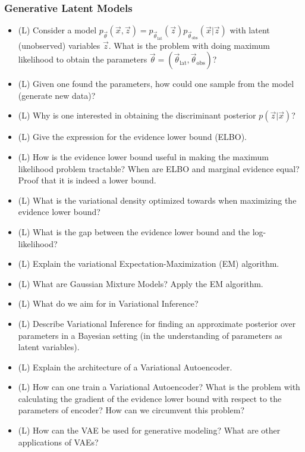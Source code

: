 \subsubsection*{Generative Latent Models}
\begin{itemize}
    \item (L) Consider a model $p_\vec{\theta}(\vec{x},\vec{z}) = p_{\vec{\theta}_{\text{lat}}}(\vec{z}) p_{\vec{\theta}_{\text{obs}}}(\vec{x} | \vec{z})$ with latent (unobserved) variables $\vec{z}$.
    What is the problem with doing maximum likelihood to obtain the parameters $\vec{\theta} = (\vec{\theta}_{\text{lat}}, \vec{\theta}_{\text{obs}})$?
    \item (L) Given one found the parameters, how could one sample from the model (generate new data)?
    \item (L) Why is one interested in obtaining the discriminant posterior $p(\vec{z} | \vec{x})$?
    \item (L) Give the expression for the evidence lower bound (ELBO).
    \item (L) How is the evidence lower bound useful in making the maximum likelihood problem tractable? When are ELBO and marginal evidence equal? Proof that it is indeed a lower bound.
    \item (L) What is the variational density optimized towards when maximizing the evidence lower bound?
    \item (L) What is the gap between the evidence lower bound and the log-likelihood?
    \item (L) Explain the variational Expectation-Maximization (EM) algorithm.
    \item (L) What are Gaussian Mixture Models? Apply the EM algorithm.
    \item (L) What do we aim for in Variational Inference?
    \item (L) Describe Variational Inference for finding an approximate posterior over parameters in a Bayesian setting (in the understanding of parameters as latent variables).
    \item (L) Explain the architecture of a Variational Autoencoder.
    \item (L) How can one train a Variational Autoencoder? What is the problem with calculating the gradient of the evidence lower bound with
    respect to the parameters of encoder? How can we circumvent this problem?
    \item (L) How can the VAE be used for generative modeling? What are other applications of VAEs?
\end{itemize}

\pagebreak